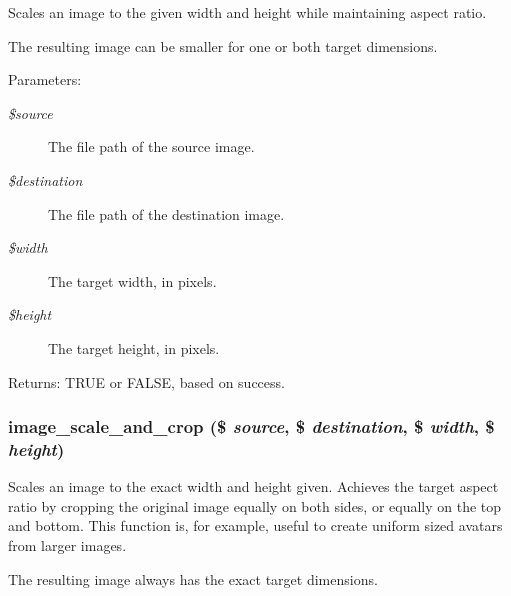 Scales an image to the given width and height while maintaining aspect ratio.

The resulting image can be smaller for one or both target dimensions.

\begin{Desc}
\item[Parameters:]
\begin{description}
\item[{\em \$source}]The file path of the source image. \item[{\em \$destination}]The file path of the destination image. \item[{\em \$width}]The target width, in pixels. \item[{\em \$height}]The target height, in pixels. \end{description}
\end{Desc}
\begin{Desc}
\item[Returns:]TRUE or FALSE, based on success. \end{Desc}
\hypertarget{group__image_g61e985c6a47a4c9d788b99fba2d452a6}{
\subsubsection[{image\_\-scale\_\-and\_\-crop}]{\setlength{\rightskip}{0pt plus 5cm}image\_\-scale\_\-and\_\-crop (\$ {\em source}, \/  \$ {\em destination}, \/  \$ {\em width}, \/  \$ {\em height})}}
\label{group__image_g61e985c6a47a4c9d788b99fba2d452a6}


Scales an image to the exact width and height given. Achieves the target aspect ratio by cropping the original image equally on both sides, or equally on the top and bottom. This function is, for example, useful to create uniform sized avatars from larger images.

The resulting image always has the exact target dimensions.

